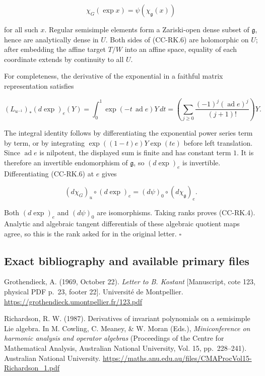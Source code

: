 \documentclass[11pt,a4paper]{article}
\theoremstyle{definition}\newtheorem{definition}[theorem]{Definition}
\theoremstyle{remark}\newtheorem{remark}[theorem]{Remark}
\begin{document}
\[
 \chi_G(\exp x)=\psi(\chi_{\mathfrak g}(x))
 \tag{CC-RK.6}
\]

for all such \(x\). Regular semisimple elements form a Zariski-open dense subset of \(\mathfrak g\), hence are analytically dense in \(U\). Both sides of (CC-RK.6) are holomorphic on \(U\); after embedding the affine target \(T/W\) into an affine space, equality of each coordinate extends by continuity to all \(U\).

For completeness, the derivative of the exponential in a faithful matrix representation satisfies

\[
 (L_{u^{-1}})_*(d\exp)_e(Y)
   =\int_0^1 \exp(-t\,\operatorname{ad}e)Y\,dt
   =\left(\sum_{j\geq0}
       \frac{(-1)^j(\operatorname{ad}e)^j}{(j+1)!}\right)Y.
 \tag{CC-RK.7}
\]

The integral identity follows by differentiating the exponential power series term by term, or by integrating
\(\exp((1-t)e)Y\exp(te)\) before left translation. Since \(\operatorname{ad}e\) is nilpotent, the displayed sum is finite and has constant term \(1\). It is therefore an invertible endomorphism of \(\mathfrak g\), so \((d\exp)_e\) is invertible. Differentiating (CC-RK.6) at \(e\) gives

\[
 (d\chi_G)_u\circ(d\exp)_e
       =(d\psi)_0\circ(d\chi_{\mathfrak g})_e.
\]

Both \((d\exp)_e\) and \((d\psi)_0\) are isomorphisms. Taking ranks proves (CC-RK.4). Analytic and algebraic tangent differentials of these algebraic quotient maps agree, so this is the rank asked for in the original letter. \(\square\)

\subsection{Exact bibliography and available primary files}\label{cc-rk-bibliography}

Grothendieck, A. (1969, October 22). \emph{Letter to B. Kostant} {[}Manuscript, cote 123, physical PDF p.~23, footer 22{]}. Université de Montpellier. \url{https://grothendieck.umontpellier.fr/123.pdf}

Richardson, R. W. (1987). Derivatives of invariant polynomials on a semisimple Lie algebra. In M. Cowling, C. Meaney, \& W. Moran (Eds.), \emph{Miniconference on harmonic analysis and operator algebras} (Proceedings of the Centre for Mathematical Analysis, Australian National University, Vol. 15, pp.~228--241). Australian National University. \url{https://maths.anu.edu.au/files/CMAProcVol15-Richardson_1.pdf}
\end{document}
